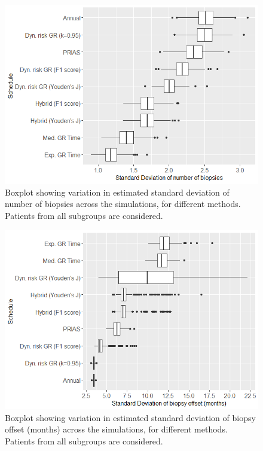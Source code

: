 \begin{figure}[!htb]
\centerline{\includegraphics[width=\columnwidth]{images/sim_study/nbSDBoxPlot_all.png}}
\caption{Boxplot showing variation in estimated standard deviation of number of biopsies across the simulations, for different methods. Patients from all subgroups are considered.}
\label{fig : nbSDBoxPlot_all}
\end{figure}

\begin{figure}[!htb]
\centerline{\includegraphics[width=\columnwidth]{images/sim_study/offsetSDBoxPlot_all.png}}
\caption{Boxplot showing variation in estimated standard deviation of biopsy offset (months) across the simulations, for different methods. Patients from all subgroups are considered.}
\label{fig : offsetSDBoxPlot_all}
\end{figure}



